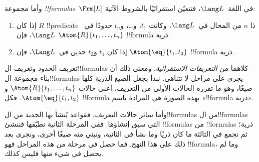 \documentclass[../../../include/open-logic-section]{subfiles}
\begin{document}
\begin{defn}[الصيغ]
وأما مجموعة \emph{!!{formula}s}~$\Frm[L]$ في اللغة~$\Lang L$،
فتتعيّن استقرائيًا بالشروط الآتية:
\begin{enumerate}


\item إذا كان $R$ !!{predicate} ذا $n$ من المحال في~$\Lang L$، وكانت
  $t_1$، و\dots، و$t_n$ حدودًا في~$\Lang L$، فإن
  $\Atom{R}{t_1,\ldots, t_n}$ !!{formula} ذرية.

\item إذا كان $t_1$ و$t_2$ حدين في~$\Lang L$، فإن
  $\Atom{\eq}{t_1, t_2}$ !!{formula} ذرية.








\end{enumerate}
\end{defn}

\begin{explain}
تعريف الحدود وتعريف ال!!{formula}s كلاهما من
\emph{التعريفات الاستقرائية}. ومعنى ذلك أن بناء مجموعة
ال!!{formula}s يجري على مراحل لا تتناهى. نبدأ بجعل الصيغ الذرية
كلها صيغًا، وهو ما تقرره الحالات الأولى من التعريف، أعني حالات
%
%
$\Atom{R}{t_1,\dots,t_n}$ و$\Atom{\eq}{t_1,t_2}$. فكل
!!{formula} بهذه الصورة هي المرادة باسم «!!{formula} ذرية».

وأما سائر حالات التعريف، فقواعد يُنشأ بها الجديد من ال!!{formula}s
من ال!!{formula}s التي سبق إنشاؤها. ففي المرحلة الثانية نطبّقها
فننشئ !!{formula}s من !!{formula}s ذرية؛ ثم نجمع في الثالثة ما
كان ذريًا وما نشأ في الثانية، ونبني منه صيغًا أخرى، ونجري بعد ذلك
على هذا النهج. فما حصل في مرحلة من هذه المراحل فهو !!{formula}،
وما لم يحصل في شيء منها فليس كذلك.
\end{explain}
\end{document}
